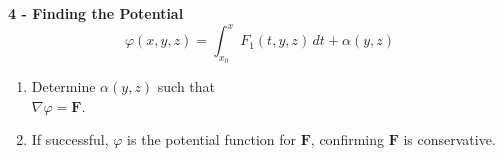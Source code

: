 \documentclass[8pt]{article}
\begin{document}
\hfill
\begin{minipage}[t]{0.29\textwidth}
    \noindent\textbf{4 - Finding the Potential} \vspace{-8px}
    \[
        \varphi(x,y,z) = \int_{x_0}^x F_1(t,y,z) \, dt + \alpha(y,z)
    \] \vspace{-25px}

    \begin{enumerate}[leftmargin=*]
        \setlength\itemsep{-4px} %
        \item Determine $\alpha(y,z)$ such that \\ $\nabla \varphi = \mathbf{F}$.
        \item If successful, $\varphi$ is the potential function for $\mathbf{F}$, confirming $\mathbf{F}$ is conservative.
    \end{enumerate}

\end{minipage}
\vspace*{-30px}
\end{document}
